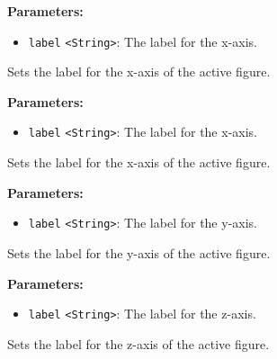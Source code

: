 \documentclass[12pt,a4paper]{article}
\begin{document}
\vspace{5mm}
\noindent {}


\noindent \textbf{Parameters:}
\begin{itemize}
  \item \texttt{label} \texttt{<String>}: The label for the x-axis.
\end{itemize}

\noindent Sets the label for the x-axis of the active figure.

\vspace{5mm}
\noindent {}


\noindent \textbf{Parameters:}
\begin{itemize}
  \item \texttt{label} \texttt{<String>}: The label for the x-axis.
\end{itemize}

\noindent Sets the label for the x-axis of the active figure.

\vspace{5mm}
\noindent {}


\noindent \textbf{Parameters:}
\begin{itemize}
  \item \texttt{label} \texttt{<String>}: The label for the y-axis.
\end{itemize}

\noindent Sets the label for the y-axis of the active figure.

\vspace{5mm}
\noindent {}


\noindent \textbf{Parameters:}
\begin{itemize}
  \item \texttt{label} \texttt{<String>}: The label for the z-axis.
\end{itemize}

\noindent Sets the label for the z-axis of the active figure.
\end{document}

